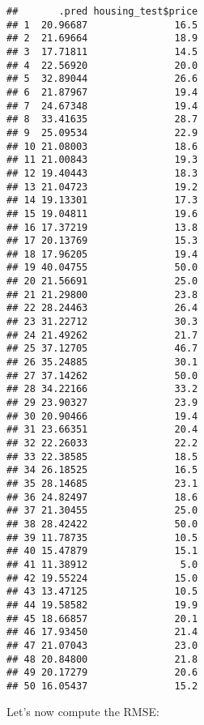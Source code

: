 \documentclass[
]{article}
\newenvironment{Shaded}{\begin{snugshade}}{\end{snugshade}}
\newcommand{\KeywordTok}[1]{\textcolor[rgb]{0.13,0.29,0.53}{\textbf{#1}}}
\newcommand{\NormalTok}[1]{#1}
\newcommand{\OperatorTok}[1]{\textcolor[rgb]{0.81,0.36,0.00}{\textbf{#1}}}
\newcommand{\StringTok}[1]{\textcolor[rgb]{0.31,0.60,0.02}{#1}}
\begin{document}
\begin{verbatim}
##       .pred housing_test$price
## 1  20.96687               16.5
## 2  21.69664               18.9
## 3  17.71811               14.5
## 4  22.56920               20.0
## 5  32.89044               26.6
## 6  21.87967               19.4
## 7  24.67348               19.4
## 8  33.41635               28.7
## 9  25.09534               22.9
## 10 21.08003               18.6
## 11 21.00843               19.3
## 12 19.40443               18.3
## 13 21.04723               19.2
## 14 19.13301               17.3
## 15 19.04811               19.6
## 16 17.37219               13.8
## 17 20.13769               15.3
## 18 17.96205               19.4
## 19 40.04755               50.0
## 20 21.56691               25.0
## 21 21.29800               23.8
## 22 28.24463               26.4
## 23 31.22712               30.3
## 24 21.49262               21.7
## 25 37.12705               46.7
## 26 35.24885               30.1
## 27 37.14262               50.0
## 28 34.22166               33.2
## 29 23.90327               23.9
## 30 20.90466               19.4
## 31 23.66351               20.4
## 32 22.26033               22.2
## 33 22.38585               18.5
## 34 26.18525               16.5
## 35 28.14685               23.1
## 36 24.82497               18.6
## 37 21.30455               25.0
## 38 28.42422               50.0
## 39 11.78735               10.5
## 40 15.47879               15.1
## 41 11.38912                5.0
## 42 19.55224               15.0
## 43 13.47125               10.5
## 44 19.58582               19.9
## 45 18.66857               20.1
## 46 17.93450               21.4
## 47 21.07043               23.0
## 48 20.84800               21.8
## 49 20.17279               20.6
## 50 16.05437               15.2
\end{verbatim}

Let's now compute the RMSE:

\begin{Shaded}
\end{Shaded}
\end{document}
